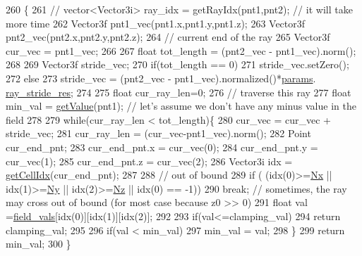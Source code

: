 \begin{DoxyCode}
260 \{       
261         \textcolor{comment}{// vector<Vector3i> ray\_idx = getRayIdx(pnt1,pnt2);  // it will take more time }
262         Vector3f pnt1\_vec(pnt1.x,pnt1.y,pnt1.z);
263         Vector3f pnt2\_vec(pnt2.x,pnt2.y,pnt2.z);
264         \textcolor{comment}{// current end of the ray }
265         Vector3f cur\_vec = pnt1\_vec;
266         
267         \textcolor{keywordtype}{float} tot\_length = (pnt2\_vec - pnt1\_vec).norm();
268         
269         Vector3f stride\_vec;        
270         \textcolor{keywordflow}{if}(tot\_length == 0)
271             stride\_vec.setZero();
272         \textcolor{keywordflow}{else} 
273             stride\_vec = (pnt2\_vec - pnt1\_vec).normalized()*\hyperlink{struct_grid_field_a735e3033049d10f084e74083ae44dd21}{params}.
      \hyperlink{struct_field_params_ae6eabaa6e593c9dbac48b2f96bea80ec}{ray\_stride\_res}; 
274  
275         \textcolor{keywordtype}{float} cur\_ray\_len=0;
276         \textcolor{comment}{// traverse this ray }
277         \textcolor{keywordtype}{float} min\_val = \hyperlink{struct_grid_field_a9b1f94c44fc47953c38b8e2fe815860d}{getValue}(pnt1); \textcolor{comment}{// let's assume we don't have any minus value in the field }
278         
279         \textcolor{keywordflow}{while}(cur\_ray\_len < tot\_length)\{            
280             cur\_vec = cur\_vec + stride\_vec;
281             cur\_ray\_len = (cur\_vec-pnt1\_vec).norm();
282             Point cur\_end\_pnt;
283             cur\_end\_pnt.x = cur\_vec(0);
284             cur\_end\_pnt.y = cur\_vec(1);
285             cur\_end\_pnt.z = cur\_vec(2);     
286             Vector3i idx = \hyperlink{struct_grid_field_a1a70c2de6239c1b086d01dc89b161b7c}{getCellIdx}(cur\_end\_pnt);    
287 
288             \textcolor{comment}{// out of bound }
289             \textcolor{keywordflow}{if} ( (idx(0)>=\hyperlink{struct_grid_field_a7777c8b5bf6db312fcceecdfd012c9ca}{Nx} || idx(1)>=\hyperlink{struct_grid_field_a4cc2cac3066c31f0e6af9745cf994674}{Ny} || idx(2)>=\hyperlink{struct_grid_field_ae624c780496411e632ca5581b84a6177}{Nz} || idx(0) == -1))
290                 \textcolor{keywordflow}{break}; \textcolor{comment}{// sometimes, the ray may cross out of bound (for most case because z0 >> 0)        
          }
291             \textcolor{keywordtype}{float} val =\hyperlink{struct_grid_field_a46802a85d9533d4371d12597f0247c7d}{field\_vals}[idx(0)][idx(1)][idx(2)];
292             
293             \textcolor{keywordflow}{if}(val<=clamping\_val)
294                 \textcolor{keywordflow}{return} clamping\_val;
295 
296             \textcolor{keywordflow}{if}(val < min\_val)
297                 min\_val = val;            
298         \}
299         \textcolor{keywordflow}{return} min\_val;        
300     \}
\end{DoxyCode}
